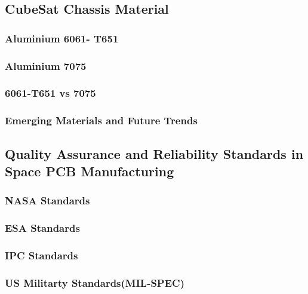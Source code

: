 \subsection{CubeSat Chassis Material} %

\subsubsection{Aluminium 6061- T651}

\subsubsection{Aluminium 7075}

\subsubsection{6061-T651 vs  7075}

\subsubsection{Emerging Materials and Future Trends} 

\subsection{Quality Assurance and Reliability Standards in Space PCB Manufacturing}

\subsubsection{NASA Standards}

\subsubsection{ESA Standards}

\subsubsection{IPC Standards}

\subsubsection{US Militarty Standards(MIL-SPEC)}


